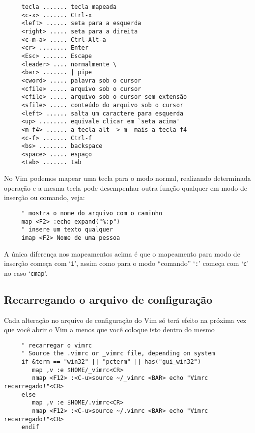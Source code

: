 \begin{verbatim}
     tecla ....... tecla mapeada
     <c-x> ....... Ctrl-x
     <left> ...... seta para a esquerda
     <right> ..... seta para a direita
     <c-m-a> ..... Ctrl-Alt-a
     <cr> ........ Enter
     <Esc> ....... Escape
     <leader> .... normalmente \
     <bar> ....... | pipe
     <cword> ..... palavra sob o cursor
     <cfile> ..... arquivo sob o cursor
     <cfile> ..... arquivo sob o cursor sem extensão
     <sfile> ..... conteúdo do arquivo sob o cursor
     <left> ...... salta um caractere para esquerda
     <up> ........ equivale clicar em `seta acima'
     <m-f4> ...... a tecla alt -> m  mais a tecla f4
     <c-f> ....... Ctrl-f
     <bs> ........ backspace
     <space> ..... espaço
     <tab> ....... tab
\end{verbatim}


No Vim podemos mapear uma tecla para o modo normal, realizando
determinada operação e a mesma tecla pode desempenhar outra função
qualquer em modo de inserção ou comando, veja:

\begin{verbatim}
     " mostra o nome do arquivo com o caminho
     map <F2> :echo expand("%:p")
     " insere um texto qualquer
     imap <F2> Nome de uma pessoa
\end{verbatim}

A única diferença nos mapeamentos acima é que o mapeamento para modo de
inserção começa com `\texttt{i}', assim como para o modo ``comando'' `\texttt{:}'
começa com `\texttt{c}' no caso `\texttt{cmap}'.

\subsection{Recarregando o arquivo de configuração}
\label{sec:Recarregando o arquivo de configuração}

Cada alteração no arquivo de configuração do Vim só terá efeito na próxima vez que você
abrir o Vim a menos que você coloque isto dentro do mesmo

\begin{verbatim}
     " recarregar o vimrc
     " Source the .vimrc or _vimrc file, depending on system
     if &term == "win32" || "pcterm" || has("gui_win32")
        map ,v :e $HOME/_vimrc<CR>
        nmap <F12> :<C-u>source ~/_vimrc <BAR> echo "Vimrc recarregado!"<CR>
     else
        map ,v :e $HOME/.vimrc<CR>
        nmap <F12> :<C-u>source ~/.vimrc <BAR> echo "Vimrc recarregado!"<CR>
     endif
\end{verbatim}

